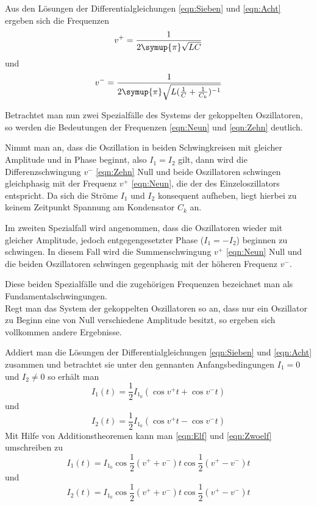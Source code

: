 Aus den Lösungen der Differentialgleichungen \ref {eqn:Sieben} und \ref {eqn:Acht} ergeben sich die Frequenzen
\begin{equation}
    v^{+} = \frac{1}{ 2\symup{\pi} \sqrt{L C}}
    \label{eqn:Neun}
\end{equation}
und
\begin{equation}
    v^{-} = \frac{1}{ 2\symup{\pi} \sqrt{L (\frac{1}{C} + \frac{1}{C_k})^{-1}}}
    \label{eqn:Zehn}
\end{equation}

Betrachtet man nun zwei Spezialfälle des Systems der gekoppelten Oszillatoren, so werden die Bedeutungen der Frequenzen \ref {eqn:Neun} und \ref {eqn:Zehn} deutlich.

Nimmt man an, dass die Oszillation in beiden Schwingkreisen mit gleicher Amplitude und in Phase beginnt, also $ I_1 = I_2 $ gilt, dann wird die Differenzschwingung $ v^{-} $ \ref {eqn:Zehn}
Null und beide Oszillatoren schwingen gleichphasig mit der Frequenz $ v^{+} $ \ref {eqn:Neun}, die der des Einzeloszillators entspricht. Da sich die Ströme $ I_1 $ und $ I_2 $ konsequent
aufheben, liegt hierbei zu keinem Zeitpunkt Spannung am Kondensator $ C_k $ an.

Im zweiten Spezialfall wird angenommen, dass die Oszillatoren wieder mit gleicher Amplitude, jedoch entgegengesetzter Phase ($ I_1 = -I_2 $) beginnen zu schwingen. In diesem Fall
wird die Summenschwingung $ v^{+} $ \ref {eqn:Neun} Null und die beiden Oszillatoren schwingen gegenphasig mit der höheren Frequenz $ v^{-} $.

Diese beiden Spezialfälle und die zugehörigen Frequenzen bezeichnet man als Fundamentalschwingungen.
\\
Regt man das System der gekoppelten Oszillatoren so an, dass nur ein Oszillator zu Beginn eine von Null verschiedene Amplitude besitzt, so ergeben sich vollkommen andere Ergebnisse.

Addiert man die Lösungen der Differentialgleichungen \ref {eqn:Sieben} und \ref {eqn:Acht} zusammen und betrachtet sie unter den gennanten
Anfangsbedingungen $ I_1 = 0 $ und $ I_2 \neq 0 $ so erhält man
\begin{equation}
    I_1(t) = \frac{1}{2} I_{1_0} (\cos v^{+} t + \cos v^{-} t )
    \label{eqn:Elf}
\end{equation}
und
\begin{equation}
    I_2(t) = \frac{1}{2} I_{1_0} (\cos v^{+} t - \cos v^{-} t )
    \label{eqn:Zwoelf}
\end{equation}
Mit Hilfe von Additionstheoremen kann man \ref {eqn:Elf} und \ref {eqn:Zwoelf} umschreiben zu
\begin{equation}
    I_1(t) = I_{1_0} \cos \frac{1}{2} (v^{+} + v^{-}) t \cos \frac{1}{2} (v^{+} - v^{-}) t
    \label{eqn:Dreizehn}
\end{equation}
und
\begin{equation}
    I_2(t) = I_{1_0} \cos \frac{1}{2} (v^{+} + v^{-}) t \cos \frac{1}{2} (v^{+} - v^{-}) t
    \label{eqn:Vierzehn}
\end{equation}


